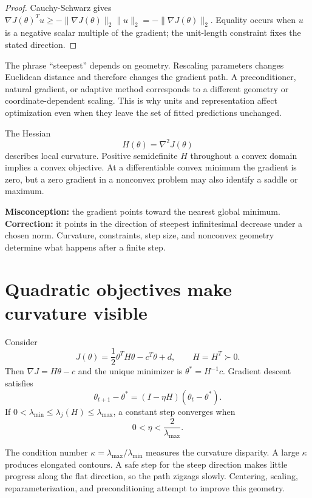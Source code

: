 \begin{proof}
Cauchy-Schwarz gives
$\nabla J(\theta)^Tu\ge
-\lVert\nabla J(\theta)\rVert_2\lVert u\rVert_2
=-\lVert\nabla J(\theta)\rVert_2$.
Equality occurs when $u$ is a negative scalar multiple of the gradient; the
unit-length constraint fixes the stated direction.
\end{proof}

The phrase ``steepest'' depends on geometry. Rescaling parameters changes
Euclidean distance and therefore changes the gradient path. A preconditioner,
natural gradient, or adaptive method corresponds to a different geometry or
coordinate-dependent scaling. This is why units and representation affect
optimization even when they leave the set of fitted predictions unchanged.

The Hessian
\[
H(\theta)=\nabla^2J(\theta)
\]
describes local curvature. Positive semidefinite $H$ throughout a convex domain
implies a convex objective. At a differentiable convex minimum the gradient is
zero, but a zero gradient in a nonconvex problem may also identify a saddle or
maximum.

\begin{misconceptionbox}
\textbf{Misconception:} the gradient points toward the nearest global minimum.
\textbf{Correction:} it points in the direction of steepest infinitesimal
decrease under a chosen norm. Curvature, constraints, step size, and nonconvex
geometry determine what happens after a finite step.
\end{misconceptionbox}

\section{Quadratic objectives make curvature visible}

Consider
\[
J(\theta)=\frac12\theta^TH\theta-c^T\theta+d,
\qquad H=H^T\succ 0.
\]
Then $\nabla J=H\theta-c$ and the unique minimizer is
$\theta^*=H^{-1}c$. Gradient descent satisfies
\[
\theta_{t+1}-\theta^*=(I-\eta H)(\theta_t-\theta^*).
\]
If $0<\lambda_{\min}\leq\lambda_j(H)\leq\lambda_{\max}$, a constant step
converges when
\[
0<\eta<\frac{2}{\lambda_{\max}}.
\]

The condition number $\kappa=\lambda_{\max}/\lambda_{\min}$ measures the
curvature disparity. A large $\kappa$ produces elongated contours. A safe step
for the steep direction makes little progress along the flat direction, so the
path zigzags slowly. Centering, scaling, reparameterization, and
preconditioning attempt to improve this geometry.

